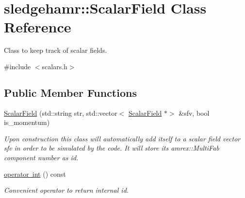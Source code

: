 \hypertarget{classsledgehamr_1_1ScalarField}{}\section{sledgehamr\+:\+:Scalar\+Field Class Reference}
\label{classsledgehamr_1_1ScalarField}


Class to keep track of scalar fields.  




{\ttfamily \#include $<$scalars.\+h$>$}

\subsection*{Public Member Functions}
\begin{DoxyCompactItemize}
\item 
\mbox{\hyperlink{classsledgehamr_1_1ScalarField_a3861e15fde648101e465c97aec2050cb}{Scalar\+Field}} (std\+::string str, std\+::vector$<$ \mbox{\hyperlink{classsledgehamr_1_1ScalarField}{Scalar\+Field}} $\ast$$>$ \&sfv, bool is\+\_\+momentum)
\begin{DoxyCompactList}\small\item\em Upon construction this class will automatically add itself to a scalar field vector sfv in order to be simulated by the code. It will store its amrex\+::\+Multi\+Fab component number as id. \end{DoxyCompactList}\item 
\mbox{\label{classsledgehamr_1_1ScalarField_a5897ea45641e16e6b9200621cb4444d9}} 
\mbox{\hyperlink{classsledgehamr_1_1ScalarField_a5897ea45641e16e6b9200621cb4444d9}{operator int}} () const
\begin{DoxyCompactList}\small\item\em Convenient operator to return internal id. \end{DoxyCompactList}\end{DoxyCompactItemize}
